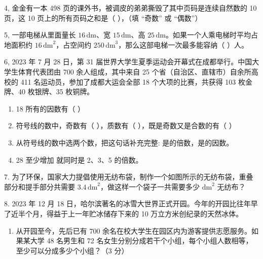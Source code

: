 \documentclass{article}
\begin{document}
\begin{CJK}{UTF8}{gbsn}
4, 金金有一本 498 页的课外书，被调皮的弟弟撕毁了其中页码是连续自然数的 10 页，这 10 页上的所有页码之和是（ ），（填 “奇数” 或 “偶数”）\par
\vspace{0.2cm}
5, 一部电梯从里面量长 \(16\, \text{dm}\)、宽 \(15\, \text{dm}\)、高 \(25\, \text{dm}\)。如果一个人乘电梯时平均占地面积约 \(16\, \text{dm}^2\)，占空间约 \(250\, \text{dm}^3\)，那么这部电梯一次最多能容纳（  ）人。 \par
\vspace{0.2cm}
6, 2023 年 7 月 28 日，第 31 届世界大学生夏季运动会开幕式在成都举行。中国大学生体育代表团由 700 余人组成，其中来自 25 个省（自治区、直辖市）自余所高校的 411 名运动员，参加了成都大运会全部 18 个大项的比赛，共获得 103 枚金牌、40 枚银牌、35 枚铜牌。
\begin{enumerate}
    \item 18 所有的因数有（ ）
    \item 符号线的数中，奇数有（ ），质数有（ ），既是奇数又是合数的有（ ）
    \item 从符号线的数中选两个数，把这句话补充完整: \underline{\hspace{1cm}} 是\underline{\hspace{1cm}}的倍数，\underline{\hspace{1cm}}是\underline{\hspace{1cm}}的因数。
    \item 28 至少增加\underline{\hspace{2cm}} 就同时是 2、3、5 的倍数。
\end{enumerate}

7. 为了环保，国家大力提倡使用无纺布袋，制作一个如图所示的无纺布袋，重叠部分和提手部分共需要 \(3.4 \, \text{dm}^2\)，做这样一个袋子一共需要多少 \(\text{dm}^2\) 无纺布？ \par
\vspace{0.2cm}
8. 2023 年 12 月 18 日，哈尔滨著名的冰雪大世界正式开园。今年的开园比往年早了近半个月，得益于上一年贮冰储存下来的 10 万立方米创纪录的天然冰体。
\begin{enumerate}
    \item 从开园至今，先后已有 700 余名在校大学生在园区内为游客提供志愿服务。如果某大学 48 名男生和 72 名女生分别分成若干个小组，每个小组人数相等，至少可以分成多少个小组？（3 分）
\end{enumerate}


\end{CJK}
\end{document}
